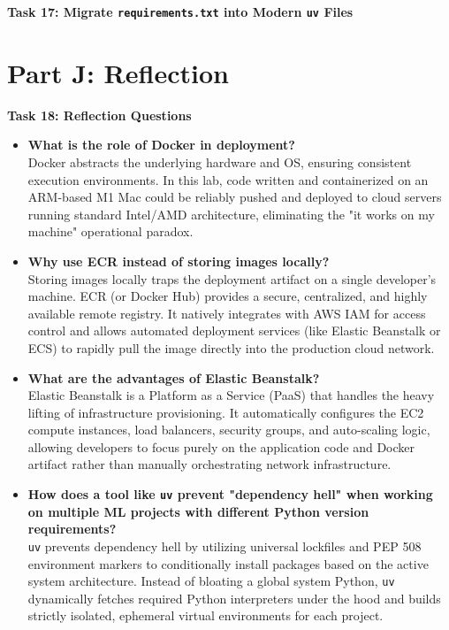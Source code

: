 \documentclass[12pt,a4paper]{article}
\begin{document}
\begin{tcolorbox}
\textbf{Task 17: Migrate \texttt{requirements.txt} into Modern \texttt{uv} Files}

\begin{center}

\end{center}
\end{tcolorbox}


\section*{Part J: Reflection}

\begin{tcolorbox}
\textbf{Task 18: Reflection Questions}

\begin{itemize}
\item \textbf{What is the role of Docker in deployment?} \\
Docker abstracts the underlying hardware and OS, ensuring consistent execution environments. In this lab, code written and containerized on an ARM-based M1 Mac could be reliably pushed and deployed to cloud servers running standard Intel/AMD architecture, eliminating the "it works on my machine" operational paradox.

\item \textbf{Why use ECR instead of storing images locally?} \\
Storing images locally traps the deployment artifact on a single developer's machine. ECR (or Docker Hub) provides a secure, centralized, and highly available remote registry. It natively integrates with AWS IAM for access control and allows automated deployment services (like Elastic Beanstalk or ECS) to rapidly pull the image directly into the production cloud network.

\item \textbf{What are the advantages of Elastic Beanstalk?} \\
Elastic Beanstalk is a Platform as a Service (PaaS) that handles the heavy lifting of infrastructure provisioning. It automatically configures the EC2 compute instances, load balancers, security groups, and auto-scaling logic, allowing developers to focus purely on the application code and Docker artifact rather than manually orchestrating network infrastructure.

\item \textbf{How does a tool like \texttt{uv} prevent "dependency hell" when working on multiple ML projects with different Python version requirements?} \\
\texttt{uv} prevents dependency hell by utilizing universal lockfiles and PEP 508 environment markers to conditionally install packages based on the active system architecture. Instead of bloating a global system Python, \texttt{uv} dynamically fetches required Python interpreters under the hood and builds strictly isolated, ephemeral virtual environments for each project.
\end{itemize}

\end{tcolorbox}

\end{document}
